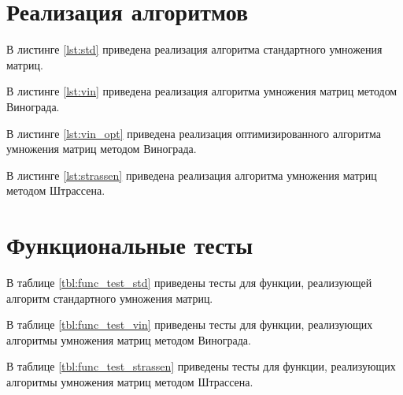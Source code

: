 \section{Реализация алгоритмов}
В листинге \ref{lst:std} приведена реализация алгоритма стандартного умножения матриц.

В листинге \ref{lst:vin} приведена реализация алгоритма умножения матриц методом Винограда.

В листинге \ref{lst:vin_opt} приведена реализация оптимизированного алгоритма умножения матриц методом Винограда.

В листинге \ref{lst:strassen} приведена реализация алгоритма умножения матриц методом Штрассена.



\clearpage



\clearpage



\clearpage



\clearpage


\section{Функциональные тесты}
В таблице \ref{tbl:func_test_std} приведены тесты для функции, реализующей алгоритм стандартного умножения матриц.

В таблице \ref{tbl:func_test_vin} приведены тесты для функции, реализующих алгоритмы умножения матриц методом Винограда.

В таблице \ref{tbl:func_test_strassen} приведены тесты для функции, реализующих алгоритмы умножения матриц методом Штрассена.

